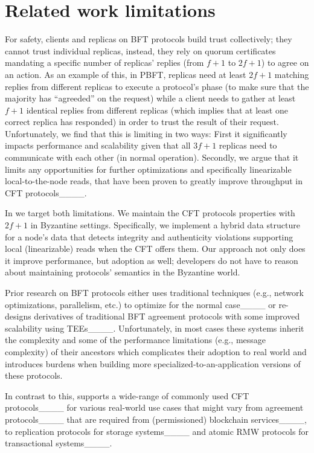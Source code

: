\section{Related work limitations}
 For safety, clients and replicas on BFT protocols build trust collectively; they cannot trust individual replicas, instead, they rely on quorum certificates mandating a specific number of replicas' replies (from $f+1$ to $2f+1$) to agree on an action. As an example of this, in PBFT, replicas need at least $2f+1$ matching replies from different replicas to execute a protocol's phase (to make sure that the majority has ``agreeded'' on the request) while a client needs to gather at least $f+1$ identical replies from different replicas (which implies that at least one correct replica has responded) in order to trust the result of their request. Unfortunately, we find that this is limiting in two ways: First it significantly impacts performance and scalability given that all $3f+1$ replicas need to communicate with each other (in normal operation). Secondly, we argue that it limits any opportunities for further optimizations and specifically linearizable local-to-the-node reads, that have been proven to greatly improve throughput in CFT protocols____.
 
In \projecttitle{} we target both limitations. We maintain the CFT protocols properties with $2f+1$ in Byzantine settings. Specifically, we implement a hybrid data structure for a node's data that detects integrity and authenticity violations supporting  local (linearizable) reads when the CFT offers them. Our approach not only does it improve performance, but adoption as well; developers do not have to reason about maintaining protocols' semantics in the Byzantine world.


 Prior research on BFT protocols either uses traditional techniques (e.g., network optimizations, parallelism, etc.) to optimize for the normal case____ or re-designs derivatives of traditional BFT agreement protocols with some improved scalability using TEEs____.  Unfortunately, in most cases these systems inherit the complexity and some of the performance limitations (e.g., message complexity) of their ancestors which complicates their adoption to real world and introduces burdens when building more specialized-to-an-application versions of these protocols. 

In contrast to this, \projecttitle{} supports a wide-range of commonly used CFT protocols____ for various real-world use cases that might vary from agreement protocols____ that are required from (permissioned) blockchain services____, to replication protocols for storage systems____ and atomic RMW protocols for transactional systems____. 



